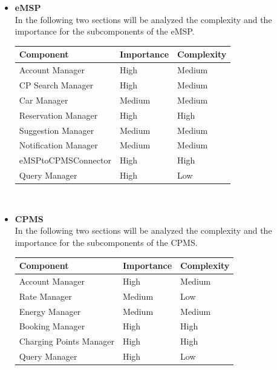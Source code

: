\begin{itemize}
    \item \textbf{eMSP} \\ In the following two sections will be analyzed the complexity and the importance for the subcomponents of the eMSP.
    
    \begin{center}
        \begin{tabular}{|p{6cm}|l|l|}
            \hline
            \textbf{Component} & \textbf{Importance} & \textbf{Complexity}\\
            \hline
            Account Manager & High & Medium \\
            \hline
            CP Search Manager & High & Medium \\
            \hline
            Car Manager & Medium & Medium \\
            \hline
            Reservation Manager & High & High \\
            \hline
            Suggestion Manager & Medium & Medium \\
            \hline
            Notification Manager & Medium & Medium \\
            \hline
            eMSPtoCPMSConnector & High & High \\
            \hline
            Query Manager & High & Low \\
            \hline
         \end{tabular}
    \end{center}
    \noindent \\
    \item \textbf{CPMS} \\ In the following two sections will be analyzed the complexity and the importance for the subcomponents of the CPMS.
    
    \begin{center}
        \begin{tabular}{|p{6cm}|l|l|}
            \hline
            \textbf{Component} & \textbf{Importance} & \textbf{Complexity}\\
            \hline
            Account Manager & High & Medium \\
            \hline
            Rate Manager & Medium & Low \\
            \hline
            Energy Manager & Medium & Medium \\
            \hline
            Booking Manager & High & High \\
            \hline
            Charging Points Manager & High & High \\
            \hline
            Query Manager & High & Low \\
            \hline
         \end{tabular}
    \end{center}
    \noindent \\
\end{itemize}

